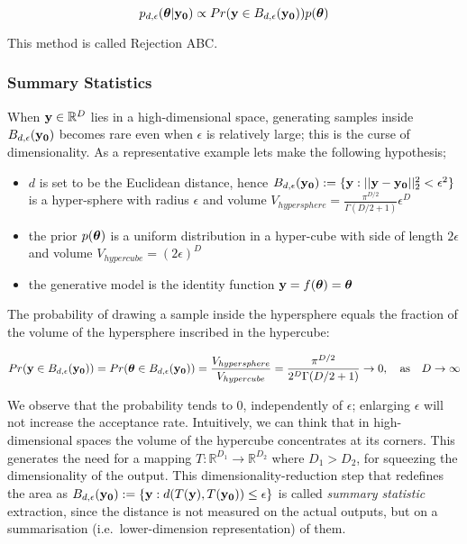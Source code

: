 \begin{equation} \label{eq:approx_posterior}
  p_{d,\epsilon}(\boldsymbol{\theta}|\mathbf{y_0}) \propto Pr(\mathbf{y} \in
  B_{d,\epsilon}(\mathbf{y_0})) p(\boldsymbol{\theta})
\end{equation}

\noindent
This method is called Rejection ABC.

\subsubsection{Summary Statistics}

When $\mathbf{y} \in \mathbb{R}^D$ lies in a high-dimensional space, generating
samples inside $B_{d,\epsilon} (\mathbf{y_0})$ becomes rare even when $\epsilon$ is
relatively large; this is the curse of dimensionality. As a
representative example lets make the following hypothesis;

\begin{itemize}
\item $d$ is set to be the Euclidean distance, hence
  $B_{d,\epsilon}(\mathbf{y_0}) := \{ \mathbf{y}: ||\mathbf{y} - \mathbf{y_0}||_2^2 < \epsilon^2 \}$ is a
  hyper-sphere with radius $\epsilon$ and volume $V_{hypersphere} = \frac{\pi^{D/2}}{\Gamma(D/2 + 1)} \epsilon^D$
\item the prior $p(\boldsymbol{\theta})$ is a uniform distribution in a hyper-cube with side of
  length $2\epsilon$ and volume $V_{hypercube} = (2\epsilon)^D$
\item the generative model is the identity function $\mathbf{y}=f(\boldsymbol{\theta})= \boldsymbol{\theta} $
\end{itemize}

\noindent
The probability of drawing a sample inside the hypersphere equals the
fraction of the volume of the hypersphere inscribed in the hypercube:

\begin{equation}
  Pr(\mathbf{y} \in B_{d,\epsilon} (\mathbf{y_0}))
  = Pr(\boldsymbol{\theta} \in B_{d,\epsilon} (\mathbf{y_0}))
  = \frac{V_{hypersphere}}{V_{hypercube}}
  = \frac{\pi^{D/2}}{2^D\Gamma(D/2 + 1)} \rightarrow 0, \quad \text{as} \quad D \rightarrow \infty
\end{equation}

\noindent
We observe that the probability tends to $0$, independently of
$\epsilon$; enlarging $\epsilon$ will not increase the acceptance
rate. Intuitively, we can think that in high-dimensional spaces the
volume of the hypercube concentrates at its corners. This generates
the need for a mapping
$T: \mathbb{R}^{D_1} \rightarrow \mathbb{R}^{D_2}$ where $D_1 > D_2$,
for squeezing the dimensionality of the output. This
dimensionality-reduction step that redefines the area as
$B_{d,\epsilon}(\mathbf{y_0}) := \{\mathbf{y}: d(T(\mathbf{y}), T(\mathbf{y_0})) \leq \epsilon \}$ is
called \textit{summary statistic} extraction, since the distance is
not measured on the actual outputs, but on a summarisation (i.e.\
lower-dimension representation) of them.

